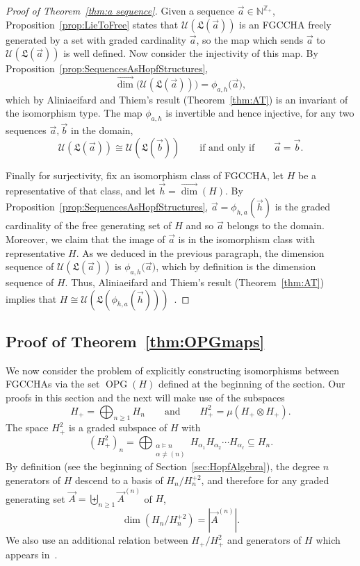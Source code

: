 \documentclass[11pt]{amsart}
\theoremstyle{definition}
\numberwithin{equation}{section}
\def\NN{{\mathbb N}}
\def\ZZ{{\mathbb Z}}
\newcommand{\FGCCHA}{\textsf{FGCCHA}\xspace}
\newcommand{\FGCCHAs}{\textsf{FGCCHA}s\xspace}
\newcommand{\vecdim}{\overrightarrow{\dim}}
\newcommand{\OPG}{\operatorname{OPG}}
\begin{document}
\begin{proof}[Proof of Theorem~\ref{thm:a sequence}]
Given a sequence $\vec{a} \in \NN^{\ZZ_+}$, Proposition~\ref{prop:LieToFree} states that
$\mathcal{U}(\mathfrak{L}(\vec{a}))$ is an \FGCCHA freely generated by a set with graded
cardinality $\vec{a}$, so the map which sends $\vec{a}$ to $\mathcal{U}(\mathfrak{L}(\vec{a}))$ is well defined.
Now consider the injectivity of this map.
By Proposition~\ref{prop:SequencesAsHopfStructures},
\[
\vecdim\big(\mathcal{U}(\mathfrak{L}(\vec{a}))\big) = \phi_{a, h}\big(\vec{a}),
\]
which by Aliniaeifard and Thiem's result (Theorem~\ref{thm:AT}) is an invariant of the isomorphism type.
The map $\phi_{a, h}$ is invertible and hence injective,
for any two sequences $\vec{a}, \vec{b}$ in the domain,
\[
\mathcal{U}(\mathfrak{L}(\vec{a})) \cong \mathcal{U}(\mathfrak{L}(\vec{b}))
\qquad\text{if and only if}\qquad
\vec{a} = \vec{b}.
\]

Finally for surjectivity, fix an isomorphism class of \FGCCHA, let $H$ be a representative of that class, and let $\vec{h} = \vecdim(H)$.
By Proposition~\ref{prop:SequencesAsHopfStructures},
$\vec{a} = \phi_{h, a}(\vec{h})$ is the graded cardinality of the free generating set
of $H$ and so
$\vec{a}$ belongs to the domain.  
Moreover, we claim that the image of $\vec{a}$ is in the isomorphism class with representative $H$.  
As we deduced in the previous paragraph, the dimension sequence of
$\mathcal{U}(\mathfrak{L}(\vec{a}))$ is $\phi_{a, h}\big(\vec{a})$, which by definition is the dimension sequence of $H$.  
Thus, Aliniaeifard and Thiem's result (Theorem~\ref{thm:AT})
implies that $H \cong \mathcal{U}(\mathfrak{L}(\phi_{h, a}(\vec{h})))$~.
\end{proof}


\subsection{Proof of Theorem~\ref{thm:OPGmaps}}
\label{sec:OPGproof}

We now consider the problem of explicitly constructing isomorphisms between \FGCCHAs via the set $\OPG(H)$ defined at the beginning of the section.  Our proofs in this section and the next will make use of the subspaces
\[
H_{+} = \bigoplus_{n \geq 1} H_n
\qquad\text{and}\qquad 
H^{2}_{+} = \mu(H_{+} \otimes H_{+}).
\]
The space $H^{2}_{+}$ is a graded subspace of $H$ with
\begin{equation}
\label{eq:Hplusdef}
(H^{2}_{+})_{n} = \bigoplus_{\substack{\alpha \vDash n \\ \alpha \neq (n)}}
H_{\alpha_{1}} H_{\alpha_{2}}\cdots H_{\alpha_{\ell}} \subseteq H_{n}.
\end{equation}
By definition (see the beginning of Section~\ref{sec:HopfAlgebra}), the degree $n$ generators of $H$ descend to a basis of $H_{n}/H_{n}^{+2}$, and therefore for any graded generating set $\vec{A} = \biguplus_{n \ge 1} \vec{A}^{(n)}$ of $H$, 
\[
\dim(H_{n}/H_{n}^{+2}) = |\vec{A}^{(n)}|.
\]
We also use an additional relation between $H_{+}/H^{2}_{+}$ and generators of $H$ which appears in~\cite{F23}.
\end{document}
